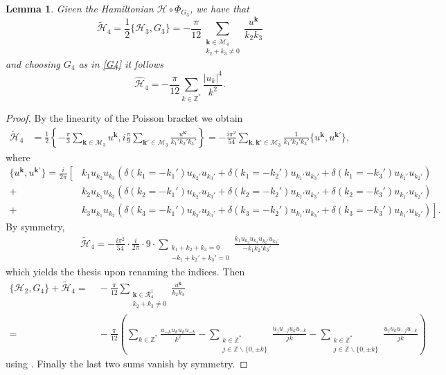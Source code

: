 \documentclass[a4paper,10pt,reqno]{article}
\theoremstyle{definition}
\theoremstyle{plain}
\theoremstyle{plain}
\theoremstyle{definition}
\theoremstyle{plain}
\theoremstyle{plain}
\theoremstyle{plain}
\newtheorem{lemma}[definition]{Lemma}
\theoremstyle{definition}
\theoremstyle{definition}
\def \Z{\mathbb Z}
\def \H{\mathcal{H}}
\def \M{\mathcal{M}}
\def \k{\bm{k}}
\begin{document}
\begin{lemma} \label{lemma: h4}
Given the Hamiltonian $\H \circ \Phi_{G_3}$, we have that
\[
\widetilde{\H}_4 = \frac{1}{2} \{ \H_3,G_3 \} = -\frac{\pi}{12} \sum_{\substack{ \k \in \M_4 \\ k_2+k_3 \neq 0}}  \frac{u^{\k}}{k_2 k_3}
\]
and choosing $G_4$ as in \eqref{G4} it follows
\[
\widehat{\H}_4 = -\frac{\pi}{12} \sum_{k \in \Z^*} \frac{|u_k|^4}{k^2}.
\]
\end{lemma}
\begin{proof}
By the linearity of the Poisson bracket we obtain
\[
\begin{split}
\widetilde{\H}_4 & = \frac{1}{2} \left \{ - \frac{\pi}{3} \sum_{\k \in \M_3} u^{\k} , i \frac{\pi}{9} \sum_{\k' \in \M_3} \frac{u^{\k'}}{k_1'k_2'k_3'} \right \} = - \frac{i\pi^2}{54} \sum_{\k,\k' \in \M_3} \frac{1}{k_1'k_2'k_3'} \{ u^{\k}, u^{\k'} \},
\end{split}
\]
where
\[
\begin{split}
\{ u^{\k}, u^{\k'} \} = \frac{i}{2 \pi} \left[  \right. &k_1 u_{k_2}u_{k_3} \left ( \delta(k_1=-k_1')u_{k_2'}u_{k_3'} + \delta(k_1=-k_2')u_{k_1'}u_{k_3'}  + \delta(k_1=-k_3')u_{k_1'}u_{k_2'} \right ) \\
+ &k_2u_{k_1}u_{k_3} \left ( \delta(k_2=-k_1')u_{k_2'}u_{k_3'} + \delta(k_2=-k_2')u_{k_1'}u_{k_3'} + \delta(k_2=-k_3')u_{k_1'}u_{k_2'} \right ) \\
+ &k_3u_{k_1}u_{k_2} \left.  \left ( \delta(k_3=-k_1')u_{k_2'}u_{k_3'} + \delta(k_3=-k_2')u_{k_1'}u_{k_3'} + \delta(k_3=-k_3')u_{k_1'}u_{k_2'} \right ) \right].
\end{split}
\]
By symmetry,
\[
\begin{split}
\widetilde{\H}_4 = - \frac{i\pi^2}{54} \cdot \frac{i}{2 \pi} \cdot 9 \cdot  \sum_{\substack{k_1+k_2+k_3=0 \\ -k_1+k_2'+k_3'=0}} \frac{k_1u_{k_2}u_{k_3}u_{k_2'}u_{k_3'}}{-k_1k_2'k_3'} 
\end{split}
\]
which yields the thesis upon renaming the indices.
Then
\[
\begin{split}
\{ \H_2,G_4 \} + \widetilde{\H}_4 =&\ -\frac{\pi}{12} \sum_{\substack{ \k \in \mathcal{R}_4^1 \\ k_2+k_3 \neq 0}}  \frac{u^{\k}}{k_2k_3} \\
=&\ - \frac{\pi}{12} \left( \sum_{k \in \Z^*} \frac{u_{-k}u_{k}u_{k}u_{-k}}{k^2} - \sum_{\substack{k \in \Z^* \\ j \in \Z \smallsetminus \{ 0, \pm k \} }} \frac{u_{j}u_{-j}u_{k}u_{-k}}{jk} - \sum_{\substack{k \in \Z^* \\ j \in \Z \smallsetminus \{ 0, \pm k \} }} \frac{u_{j}u_{k}u_{-j}u_{-k}}{jk}\right)
\end{split}
\]
using . 
Finally the last two sums vanish by symmetry.
\end{proof}
\end{document}
